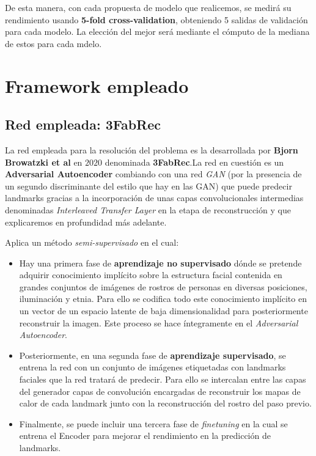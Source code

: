         \medskip

        \noindent De esta manera, con cada propuesta de modelo que realicemos, se medirá su rendimiento usando \textbf{5-fold cross-validation}, obteniendo 5 salidas de validación para cada modelo. La elección del mejor será mediante el cómputo de la mediana de estos para cada mdelo.

\section{Framework empleado}
               
    \subsection{Red empleada: 3FabRec}
        \noindent La red empleada para la resolución del problema es la desarrollada por \textbf{Bjorn Browatzki et al} en $2020$ \cite{browatzki20203fabrec} denominada \textbf{3FabRec}.La red en cuestión es un \textbf{Adversarial Autoencoder} combiando con una red \textit{GAN} (por la presencia de un segundo discriminante del estilo que hay en las GAN) que puede predecir landmarks gracias a la incorporación de unas capas convolucionales intermedias denominadas \textit{Interleaved Transfer Layer} en la etapa de reconstrucción y que explicaremos en profundidad más adelante.            

        \medskip

        \noindent Aplica un método \textit{semi-supervisado} en el cual:

        \begin{itemize}
            \item Hay una primera fase de \textbf{aprendizaje no supervisado} dónde se pretende adquirir conocimiento implícito sobre la estructura facial contenida en grandes conjuntos de imágenes de rostros de personas en diversas posiciones, iluminación y etnia. Para ello se codifica todo este conocimiento implícito en un vector de un espacio latente de baja dimensionalidad para posteriormente reconstruir la imagen. Este proceso se hace íntegramente en el \textit{Adversarial Autoencoder}.
            \item Posteriormente, en una segunda fase de \textbf{aprendizaje supervisado}, se entrena la red con un conjunto de imágenes etiquetadas con landmarks faciales que la red tratará de predecir. Para ello se intercalan entre las capas del generador capas de convolución encargadas de reconstruir los mapas de calor de cada landmark junto con la reconstrucción del rostro del paso previo.
            \item Finalmente, se puede incluir una tercera fase de \textit{finetuning} en la cual se entrena el Encoder para mejorar el rendimiento en la predicción de landmarks.
        \end{itemize} 

